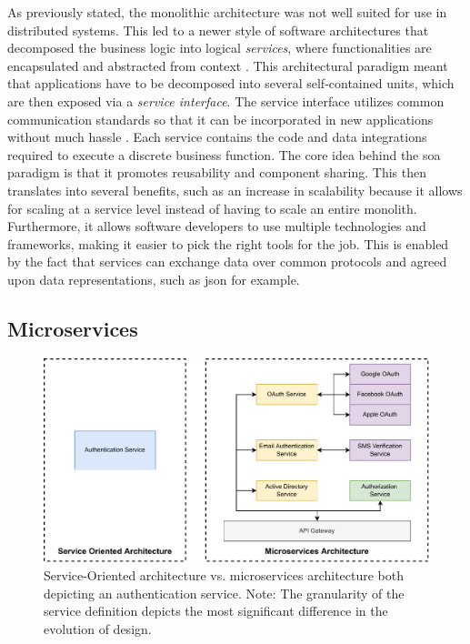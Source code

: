 As previously stated, the \gls{monolith}ic architecture was not well suited for use in distributed systems. This led to a newer style of software architectures that decomposed the business logic into  logical \textit{services}, where functionalities are encapsulated and abstracted from context \cite{perrey2003service}. This architectural paradigm meant that applications have to be decomposed into several self-contained units, which are then exposed via a \textit{service interface}. The service interface utilizes common communication standards so that it can be incorporated in new applications without much hassle \cite{ibm-soa}. Each service contains the code and data integrations required to execute a discrete business function. The core idea behind the \gls{soa} paradigm is that it promotes reusability and component sharing. This then translates into several benefits, such as an increase in scalability because it allows for scaling at a service level instead of having to scale an entire monolith. Furthermore, it allows software developers to use multiple technologies and frameworks, making it easier to pick the right tools for the job. This is enabled by the fact that services can exchange data over common protocols and agreed upon data representations, such as \gls{json} for example.


\subsection{Microservices}
\label{sec:background:soa:microservices}


\begin{figure}[!t]
    \centering
    
    \includegraphics[width=.8\linewidth]{2_background/figures/microservices-vs-soa.pdf}

    \caption[The granularity of a microservices architecture.]{Service-Oriented architecture vs. microservices architecture both depicting an authentication service. Note: The granularity of the service definition depicts the most significant difference in the evolution of design.}
    \label{fig:soa-vs-microservices}
\end{figure}

